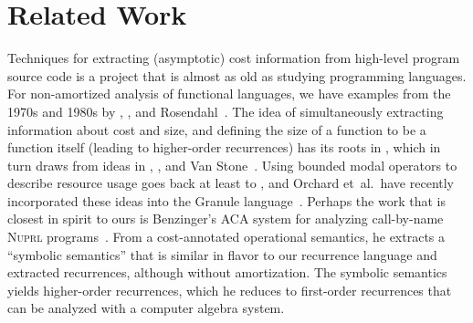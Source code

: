 \section{Related Work}
\label{sec:related-work}
Techniques for extracting (asymptotic)
cost information from high-level program source
code is a project that is almost as old as studying programming languages.
For non-amortized analysis of
functional languages, we have examples from the 1970s and
1980s by \citet{wegbreit:cacm75}, \citet{lematayer:toplas88}, and
Rosendahl~\cite{rosendahl:auto-complexity-analysis}.  The idea of
simultaneously extracting information about cost and size, and defining the
size of a function to be a function itself (leading to higher-order
recurrences) has its roots in \citet{danner-royer:ats-lmcs},
which in turn draws from ideas in \citet{shultis:complexity},
\citet{sands:thesis}, and Van Stone~\cite{vanstone:thesis}.  Using
bounded modal operators to describe resource usage goes back at least to
\citet{girard-et-al:tcs92:bll}, and Orchard et~al.\ have
recently incorporated these ideas into the Granule
language~\cite{orchard-et-al:icfp19:graded-modal-types}.  Perhaps the
work that is closest in spirit to ours is Benzinger's ACA system for
analyzing call-by-name \textsc{Nuprl} programs~\cite{benzinger:tcs04}.  From
a cost-annotated operational semantics, he extracts a ``symbolic semantics''
that is similar in flavor to our recurrence language and extracted
recurrences, although without amortization.  The symbolic semantics yields
higher-order recurrences, which he reduces to first-order recurrences that
can be analyzed with a computer algebra system.  

